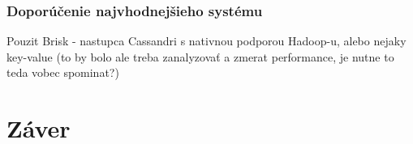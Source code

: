 \documentclass[11pt,twoside,a4paper]{book}
\begin{document}
\subsection{Doporúčenie najvhodnejšieho systému}
Pouzit Brisk - nastupca Cassandri s nativnou podporou Hadoop-u, alebo nejaky key-value (to by bolo ale treba zanalyzovať a zmerat performance, je nutne to teda vobec spominat?)



\chapter{Záver}























%
{
\def\CS{$\cal C\kern-0.1667em\lower.5ex\hbox{$\cal S$}\kern-0.075em $}

}

%

\appendix
\end{document}
